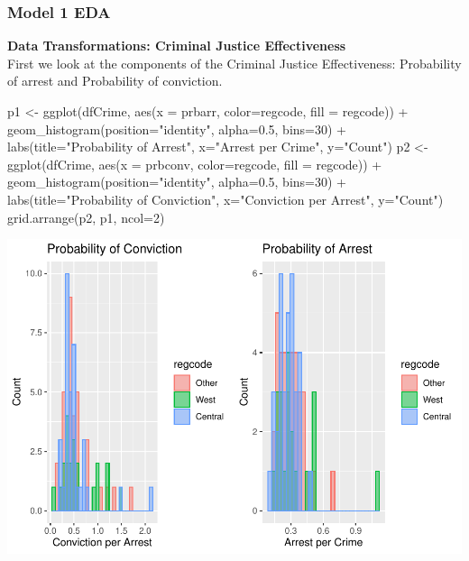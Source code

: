 \documentclass[]{article}
\newenvironment{Shaded}{}{}
\newcommand{\DataTypeTok}[1]{#1}
\newcommand{\DecValTok}[1]{#1}
\newcommand{\FloatTok}[1]{#1}
\newcommand{\KeywordTok}[1]{\textcolor[rgb]{0.00,0.00,1.00}{#1}}
\newcommand{\NormalTok}[1]{#1}
\newcommand{\OperatorTok}[1]{#1}
\newcommand{\StringTok}[1]{\textcolor[rgb]{0.00,0.50,0.50}{#1}}
\begin{document}
\hypertarget{model-1-eda}{%
\subsubsection{Model 1 EDA}\label{model-1-eda}}

\textbf{Data Transformations: Criminal Justice Effectiveness}\\
First we look at the components of the Criminal Justice Effectiveness:
Probability of arrest and Probability of conviction.

\begin{Shaded}
\begin{Highlighting}[]
\NormalTok{p1 <-}\StringTok{ }\KeywordTok{ggplot}\NormalTok{(dfCrime, }\KeywordTok{aes}\NormalTok{(}\DataTypeTok{x =}\NormalTok{ prbarr, }\DataTypeTok{color=}\NormalTok{regcode, }\DataTypeTok{fill =}\NormalTok{ regcode)) }\OperatorTok{+}
\StringTok{  }\KeywordTok{geom_histogram}\NormalTok{(}\DataTypeTok{position=}\StringTok{"identity"}\NormalTok{, }\DataTypeTok{alpha=}\FloatTok{0.5}\NormalTok{, }\DataTypeTok{bins=}\DecValTok{30}\NormalTok{) }\OperatorTok{+}
\StringTok{  }\KeywordTok{labs}\NormalTok{(}\DataTypeTok{title=}\StringTok{"Probability of Arrest"}\NormalTok{, }\DataTypeTok{x=}\StringTok{"Arrest per Crime"}\NormalTok{, }\DataTypeTok{y=}\StringTok{"Count"}\NormalTok{)}
\NormalTok{p2 <-}\StringTok{ }\KeywordTok{ggplot}\NormalTok{(dfCrime, }\KeywordTok{aes}\NormalTok{(}\DataTypeTok{x =}\NormalTok{ prbconv, }\DataTypeTok{color=}\NormalTok{regcode, }\DataTypeTok{fill =}\NormalTok{ regcode)) }\OperatorTok{+}
\StringTok{  }\KeywordTok{geom_histogram}\NormalTok{(}\DataTypeTok{position=}\StringTok{"identity"}\NormalTok{, }\DataTypeTok{alpha=}\FloatTok{0.5}\NormalTok{, }\DataTypeTok{bins=}\DecValTok{30}\NormalTok{) }\OperatorTok{+}
\StringTok{  }\KeywordTok{labs}\NormalTok{(}\DataTypeTok{title=}\StringTok{"Probability of Conviction"}\NormalTok{, }\DataTypeTok{x=}\StringTok{"Conviction per Arrest"}\NormalTok{, }\DataTypeTok{y=}\StringTok{"Count"}\NormalTok{)}
\KeywordTok{grid.arrange}\NormalTok{(p2, p1, }\DataTypeTok{ncol=}\DecValTok{2}\NormalTok{)}
\end{Highlighting}
\end{Shaded}

\includegraphics{Bagnard_Gaustad_Hartman_Leung_Lab_3_files/figure-latex/unnamed-chunk-47-1.pdf}
\end{document}
